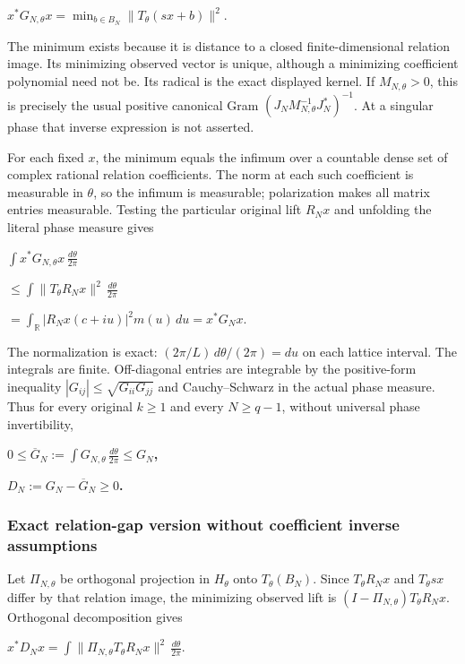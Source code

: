 \(x^*G_{N,\theta}x=\min_{b\in B_N}\|T_\theta(sx+b)\|^2\).

The minimum exists because it is distance to a closed finite-dimensional relation image. Its minimizing observed vector is unique, although a minimizing coefficient polynomial need not be. Its radical is the exact displayed kernel. If \(M_{N,\theta}>0\), this is precisely the usual positive canonical Gram \((J_NM_{N,\theta}^{-1}J_N^*)^{-1}\). At a singular phase that inverse expression is not asserted.

For each fixed \(x\), the minimum equals the infimum over a countable dense set of complex rational relation coefficients. The norm at each such coefficient is measurable in \(\theta\), so the infimum is measurable; polarization makes all matrix entries measurable. Testing the particular original lift \(R_Nx\) and unfolding the literal phase measure gives

\(\int x^*G_{N,\theta}x\,\frac{d\theta}{2\pi}\)

\(\le\int\|T_\theta R_Nx\|^2\,\frac{d\theta}{2\pi}\)

\(=\int_{\mathbb R}|R_Nx(c+iu)|^2m(u)\,du=x^*G_Nx\).

The normalization is exact: \((2\pi/L)\,d\theta/(2\pi)=du\) on each lattice interval. The integrals are finite. Off-diagonal entries are integrable by the positive-form inequality \(|G_{ij}|\le\sqrt{G_{ii}G_{jj}}\) and Cauchy--Schwarz in the actual phase measure. Thus for every original \(k\ge1\) and every \(N\ge q-1\), without universal phase invertibility,

\textbf{\(0\le\overline G_N:=\int G_{N,\theta}\,\frac{d\theta}{2\pi}\le G_N\),}

\textbf{\(D_N:=G_N-\overline G_N\ge0\).}

\subsubsection{Exact relation-gap version without coefficient inverse assumptions}\label{exact-relation-gap-version-without-coefficient-inverse-assumptions}

Let \(\Pi_{N,\theta}\) be orthogonal projection in \(H_\theta\) onto \(T_\theta(B_N)\). Since \(T_\theta R_Nx\) and \(T_\theta sx\) differ by that relation image, the minimizing observed lift is \((I-\Pi_{N,\theta})T_\theta R_Nx\). Orthogonal decomposition gives

\(x^*D_Nx=\int\|\Pi_{N,\theta}T_\theta R_Nx\|^2\,\frac{d\theta}{2\pi}\).

